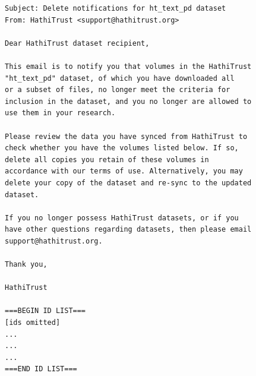 \documentclass[final]{anthology-ch} %
\begin{document}
\begin{verbatim}
Subject: Delete notifications for ht_text_pd dataset
From: HathiTrust <support@hathitrust.org>

Dear HathiTrust dataset recipient,

This email is to notify you that volumes in the HathiTrust
"ht_text_pd" dataset, of which you have downloaded all
or a subset of files, no longer meet the criteria for
inclusion in the dataset, and you no longer are allowed to
use them in your research.

Please review the data you have synced from HathiTrust to
check whether you have the volumes listed below. If so,
delete all copies you retain of these volumes in
accordance with our terms of use. Alternatively, you may
delete your copy of the dataset and re-sync to the updated
dataset.

If you no longer possess HathiTrust datasets, or if you
have other questions regarding datasets, then please email
support@hathitrust.org.

Thank you,

HathiTrust

===BEGIN ID LIST===
[ids omitted]
...
...
...
===END ID LIST===
\end{verbatim}

\end{document}
